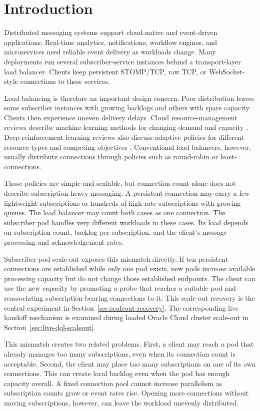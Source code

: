 \section{Introduction}

Distributed messaging systems support cloud-native and event-driven applications. Real-time analytics, notifications, workflow engines, and microservices need reliable event delivery as workloads change. Many deployments run several subscriber-service instances behind a transport-layer load balancer. Clients keep persistent STOMP/TCP, raw TCP, or WebSocket-style connections to these services.

Load balancing is therefore an important design concern. Poor distribution leaves some subscriber instances with growing backlogs and others with spare capacity. Clients then experience uneven delivery delays. Cloud resource-management reviews describe machine-learning methods for changing demand and capacity \cite{Khan2022MLCloudReview}. Deep-reinforcement-learning reviews also discuss adaptive policies for different resource types and competing objectives \cite{Zhou2024DRLCloudReview}. Conventional load balancers, however, usually distribute connections through policies such as round-robin or least-connections.

Those policies are simple and scalable, but connection count alone does not describe subscription-heavy messaging. A persistent connection may carry a few lightweight subscriptions or hundreds of high-rate subscriptions with growing queues. The load balancer may count both cases as one connection. The subscriber pod handles very different workloads in these cases. Its load depends on subscription count, backlog per subscription, and the client's message-processing and acknowledgement rates.

Subscriber-pod scale-out exposes this mismatch directly. If ten persistent
connections are established while only one pod exists, new pods increase
available processing capacity but do not change those established endpoints.
The client can use the new capacity by promoting a probe that reaches a
suitable pod and reassociating subscription-bearing connections to it. This
scale-out recovery is the central experiment in Section~\ref{sec:scaleout-recovery}.
The corresponding live handoff mechanism is examined during loaded Oracle
Cloud cluster scale-out in Section~\ref{sec:live-dql-scaleout}.

This mismatch creates two related problems. First, a client may reach a pod that already manages too many subscriptions, even when its connection count is acceptable. Second, the client may place too many subscriptions on one of its own connections. This can create local backlog even when the pod has enough capacity overall. A fixed connection pool cannot increase parallelism as subscription counts grow or event rates rise. Opening more connections without moving subscriptions, however, can leave the workload unevenly distributed.

